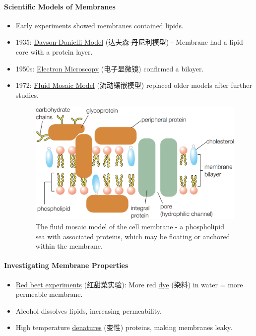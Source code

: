 \paragraph{Scientific Models of Membranes}
\begin{itemize}
    \item Early experiments showed membranes contained lipids.
    \item 1935: \underline{Davson-Danielli Model} (达夫森-丹尼利模型) - Membrane had a lipid core with a protein layer.
    \item 1950s: \underline{Electron Microscopy} (电子显微镜) confirmed a bilayer.
    \item 1972: \underline{Fluid Mosaic Model} (流动镶嵌模型) replaced older models after further studies.
    \begin{figure}[H]
        \centering
        \includegraphics[scale=0.18]{Biology/2A/Images/2A-1-4.png}
        \caption{The fluid mosaic model of the cell membrane - a phospholipid sea with associated proteins, which may be floating
        or anchored within the membrane.}
    \end{figure}
\end{itemize}

\paragraph{Investigating Membrane Properties}
\begin{itemize}
    \item \underline{Red beet experiments} (红甜菜实验): More red \underline{dye} (染料) in water = more permeable membrane.
    \item Alcohol dissolves lipids, increasing permeability.
    \item High temperature \underline{denatures} (变性) proteins, making membranes leaky.
\end{itemize}

